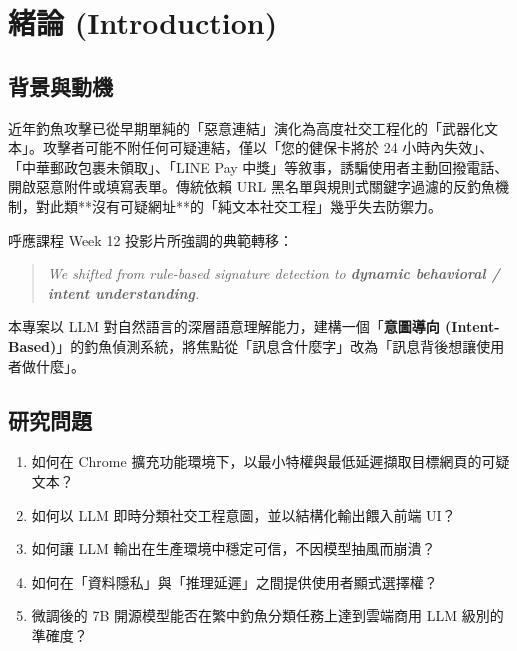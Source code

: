 \documentclass[11pt, a4paper]{article}
\begin{document}
\section{緒論 (Introduction)}

\subsection{背景與動機}
近年釣魚攻擊已從早期單純的「惡意連結」演化為高度社交工程化的「武器化文本」\cite{apruzzese2022}。攻擊者可能不附任何可疑連結，僅以「您的健保卡將於 24 小時內失效」、「中華郵政包裹未領取」、「LINE Pay 中獎」等敘事，誘騙使用者主動回撥電話、開啟惡意附件或填寫表單。傳統依賴 URL 黑名單與規則式關鍵字過濾的反釣魚機制\cite{khonji2013}，對此類**沒有可疑網址**的「純文本社交工程」幾乎失去防禦力。

呼應課程 Week 12 投影片所強調的典範轉移：

\begin{quote}
\textit{We shifted from rule-based signature detection to \textbf{dynamic behavioral / intent understanding}.}
\end{quote}

本專案以 LLM 對自然語言的深層語意理解能力，建構一個「\textbf{意圖導向 (Intent-Based)}」的釣魚偵測系統，將焦點從「訊息含什麼字」改為「訊息背後想讓使用者做什麼」。

\subsection{研究問題}
\begin{enumerate}[leftmargin=2em]
  \item 如何在 Chrome 擴充功能環境下，以最小特權與最低延遲擷取目標網頁的可疑文本？
  \item 如何以 LLM 即時分類社交工程意圖，並以結構化輸出餵入前端 UI？
  \item 如何讓 LLM 輸出在生產環境中穩定可信，不因模型抽風而崩潰？
  \item 如何在「資料隱私」與「推理延遲」之間提供使用者顯式選擇權？
  \item 微調後的 7B 開源模型能否在繁中釣魚分類任務上達到雲端商用 LLM 級別的準確度？
\end{enumerate}
\end{document}
